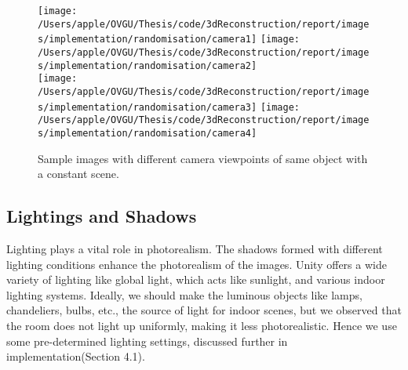 \begin{figure}
    \centering
    \texttt{[image: /Users/apple/OVGU/Thesis/code/3dReconstruction/report/images/implementation/randomisation/camera1]}
    \texttt{[image: /Users/apple/OVGU/Thesis/code/3dReconstruction/report/images/implementation/randomisation/camera2]}\\
    \vspace{0.1cm}
    \texttt{[image: /Users/apple/OVGU/Thesis/code/3dReconstruction/report/images/implementation/randomisation/camera3]}
    \texttt{[image: /Users/apple/OVGU/Thesis/code/3dReconstruction/report/images/implementation/randomisation/camera4]}\\
    \caption{Sample images with different camera viewpoints of same object with a constant scene.}
    \label{fig:Camera viewpoints}
\end{figure}

\subsection{Lightings and Shadows}\label{subsec:lightings-and-shadows}

Lighting plays a vital role in photorealism.
The shadows formed with different lighting conditions enhance the photorealism of the images.
Unity offers a wide variety of lighting like global light, which acts like sunlight, and various indoor lighting systems.
Ideally, we should make the luminous objects like lamps, chandeliers, bulbs, etc.,
the source of light for indoor scenes, but we observed that the room does not light up uniformly, making it less photorealistic.
Hence we use some pre-determined lighting settings, discussed further in implementation(Section 4.1).


